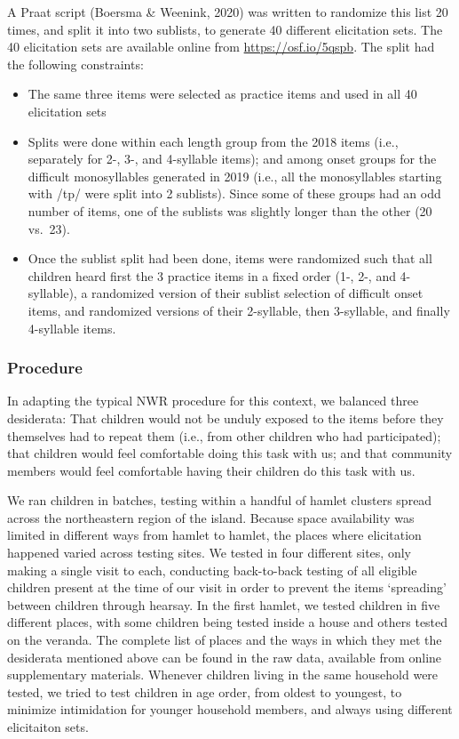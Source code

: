 \documentclass[english,,man,floatsintext]{apa6}
\providecommand{\tightlist}{%
  \setlength{\itemsep}{0pt}\setlength{\parskip}{0pt}}
\begin{document}
A Praat script (Boersma \& Weenink, 2020) was written to randomize this
list 20 times, and split it into two sublists, to generate 40 different
elicitation sets. The 40 elicitation sets are available online from
\url{https://osf.io/5qspb}. The split had the following constraints:

\begin{itemize}
\tightlist
\item
  The same three items were selected as practice items and used in all
  40 elicitation sets
\item
  Splits were done within each length group from the 2018 items (i.e.,
  separately for 2-, 3-, and 4-syllable items); and among onset groups
  for the difficult monosyllables generated in 2019 (i.e., all the
  monosyllables starting with /tp/ were split into 2 sublists). Since
  some of these groups had an odd number of items, one of the sublists
  was slightly longer than the other (20 vs.~23).
\item
  Once the sublist split had been done, items were randomized such that
  all children heard first the 3 practice items in a fixed order (1-,
  2-, and 4-syllable), a randomized version of their sublist selection
  of difficult onset items, and randomized versions of their 2-syllable,
  then 3-syllable, and finally 4-syllable items.
\end{itemize}

\subsubsection{Procedure}\label{procedure}

In adapting the typical NWR procedure for this context, we balanced
three desiderata: That children would not be unduly exposed to the items
before they themselves had to repeat them (i.e., from other children who
had participated); that children would feel comfortable doing this task
with us; and that community members would feel comfortable having their
children do this task with us.

We ran children in batches, testing within a handful of hamlet clusters
spread across the northeastern region of the island. Because space
availability was limited in different ways from hamlet to hamlet, the
places where elicitation happened varied across testing sites. We tested
in four different sites, only making a single visit to each, conducting
back-to-back testing of all eligible children present at the time of our
visit in order to prevent the items `spreading' between children through
hearsay. In the first hamlet, we tested children in five different
places, with some children being tested inside a house and others tested
on the veranda. The complete list of places and the ways in which they
met the desiderata mentioned above can be found in the raw data,
available from online supplementary materials. Whenever children living
in the same household were tested, we tried to test children in age
order, from oldest to youngest, to minimize intimidation for younger
household members, and always using different elicitaiton sets.
\end{document}
